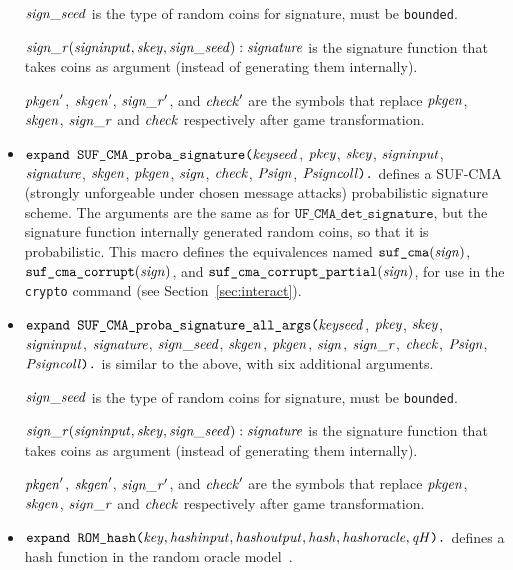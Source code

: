 \documentclass{article}
\begin{document}
\begin{itemize}
  $\mathit{sign\_seed}$ is the type of random coins for signature, must be \texttt{bounded}.

  $\mathit{sign\_r}(\mathit{signinput}, \mathit{skey}, \mathit{sign\_seed}): \mathit{signature}$ is the signature function that takes coins as argument (instead of generating them internally).

  $\mathit{pkgen}'$, $\mathit{skgen}'$, $\mathit{sign\_r}'$, and $\mathit{check}'$ are the symbols that replace $\mathit{pkgen}$, $\mathit{skgen}$, $\mathit{sign\_r}$ and $\mathit{check}$ respectively after game transformation.

\item $\texttt{expand SUF\_CMA\_proba\_signature(}\mathit{keyseed}$, $\mathit{pkey}$, $\mathit{skey}$,
$  \mathit{signinput}$, $\mathit{signature}$, $\mathit{skgen}$, $\mathit{pkgen}$, $\mathit{sign}$, $
  \mathit{check}$, $\mathit{Psign}$, $\mathit{Psigncoll}\texttt{).}$ defines a
  SUF-CMA (strongly unforgeable under chosen message attacks)
  probabilistic signature scheme.
  The arguments are the same as for $\texttt{UF\_CMA\_det\_signature}$,
  but the signature function internally generated random coins,
  so that it is probabilistic.
   This macro defines the equivalences named
   $\texttt{suf\_cma}(\mathit{sign})$,
   $\texttt{suf\_cma\_corrupt}(\mathit{sign})$, and
   $\texttt{suf\_cma\_corrupt\_partial}(\mathit{sign})$, for use in the
   \texttt{crypto} command (see Section~\ref{sec:interact}).

\item $\texttt{expand SUF\_CMA\_proba\_signature\_all\_args(}\mathit{keyseed}$, $\mathit{pkey}$, $\mathit{skey}$,
  $\mathit{signinput}$, $\mathit{signature}$, $\mathit{sign\_seed}$, $\mathit{skgen}$, $\mathit{pkgen}$, $\mathit{sign}$, $\mathit{sign\_r}$, $
  \mathit{check}$, $\mathit{Psign}$, $\mathit{Psigncoll}\texttt{).}$ is similar to the above,
  with six additional arguments. 

  $\mathit{sign\_seed}$ is the type of random coins for signature, must be \texttt{bounded}.

  $\mathit{sign\_r}(\mathit{signinput}, \mathit{skey}, \mathit{sign\_seed}): \mathit{signature}$ is the signature function that takes coins as argument (instead of generating them internally).

  $\mathit{pkgen}'$, $\mathit{skgen}'$, $\mathit{sign\_r}'$, and $\mathit{check}'$ are the symbols that replace $\mathit{pkgen}$, $\mathit{skgen}$, $\mathit{sign\_r}$ and $\mathit{check}$ respectively after game transformation.

\item $\texttt{expand ROM\_hash(}\mathit{key}, \mathit{hashinput}, \mathit{hashoutput}, \mathit{hash}, \mathit{hashoracle}, \mathit{qH}\texttt{).}$
defines a hash function in the random oracle model~\cite{Bellare93b}.


\end{itemize}
\end{document}

